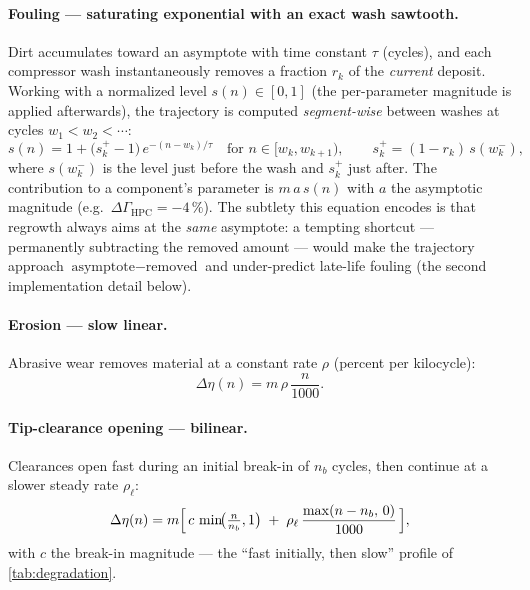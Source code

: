 \paragraph{Fouling --- saturating exponential with an exact wash sawtooth.} Dirt
accumulates toward an asymptote with time constant $\tau$ (cycles), and each compressor
wash instantaneously removes a fraction $r_k$ of the \emph{current} deposit. Working with a
normalized level $s(n) \in [0,1]$ (the per-parameter magnitude is applied afterwards), the
trajectory is computed \emph{segment-wise} between washes at cycles $w_1 < w_2 < \cdots$:
\begin{equation}
  s(n) = 1 + \bigl(s_k^{+} - 1\bigr)\, e^{-(n - w_k)/\tau}
  \quad\text{for } n \in [w_k, w_{k+1}), \qquad
  s_k^{+} = (1 - r_k)\, s(w_k^{-}),
  \label{eq:fouling}
\end{equation}
where $s(w_k^{-})$ is the level just before the wash and $s_k^{+}$ just after. The
contribution to a component's parameter is $m\,a\,s(n)$ with $a$ the asymptotic magnitude
(e.g.\ $\Delta\Gamma_{\text{HPC}} = -4\,\%$). The subtlety this equation encodes is that
regrowth always aims at the \emph{same} asymptote: a tempting shortcut --- permanently
subtracting the removed amount --- would make the trajectory approach
$\text{asymptote} - \text{removed}$ and under-predict late-life fouling (the second
implementation detail below).

\paragraph{Erosion --- slow linear.} Abrasive wear removes material at a constant rate
$\rho$ (percent per kilocycle):
\begin{equation}
  \Delta\eta(n) = m\,\rho\,\frac{n}{1000}.
  \label{eq:erosion}
\end{equation}

\paragraph{Tip-clearance opening --- bilinear.} Clearances open fast during an initial
break-in of $n_b$ cycles, then continue at a slower steady rate $\rho_\ell$:
\begin{equation}
  \Delta\eta(n) = m\Bigl[\, c\, \min\!\bigl(\tfrac{n}{n_b}, 1\bigr)
  \;+\; \rho_\ell\, \frac{\max(n - n_b,\, 0)}{1000} \,\Bigr],
  \label{eq:bilinear}
\end{equation}
with $c$ the break-in magnitude --- the ``fast initially, then slow'' profile of
\cref{tab:degradation}.

